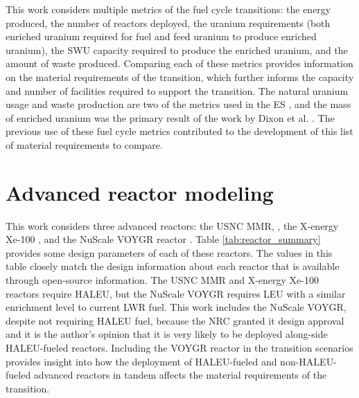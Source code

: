 This work considers multiple metrics of the fuel cycle transitions: 
the energy produced, the number of reactors deployed, the 
uranium requirements (both enriched uranium required for fuel and feed uranium 
to produce enriched uranium), 
the \gls{SWU} capacity required to produce the enriched uranium, and the 
amount of waste produced. Comparing each of these metrics provides 
information on the material requirements of the transition, which further 
informs the capacity and number of facilities required to support 
the transition. The natural 
uranium usage and waste production are two of the metrics used in the 
\acrfull{ES} 
\cite{wigeland_nuclear_2014}, and the mass of enriched uranium was the 
primary result of the work by Dixon et al. \cite{dixon_estimated_2022}. 
The previous use of these fuel cycle metrics contributed to the development 
of this list of material requirements to compare.

\section{Advanced reactor modeling} \label{sec:reactor_methods}
This work considers three advanced reactors: the \gls{USNC} \gls{MMR}, 
\cite{mitchell_usnc_2020,noauthor_usnc_2021}, the X-energy Xe-100 
\cite{mulder_overview_2021}, and the NuScale VOYGR reactor
\cite{nuscale_chapter_2020-1,reyes_nuscale_2021,reyes_correction_2022}. 
Table \ref{tab:reactor_summary} provides some design parameters 
of each of these reactors. The values in this table closely match the 
design information about each reactor that is available through open-source 
information. The 
\gls{USNC} \gls{MMR} and X-energy Xe-100 reactors require \gls{HALEU}, 
but the NuScale VOYGR requires \gls{LEU} with a similar enrichment level 
to current \gls{LWR} fuel. This work 
includes the NuScale VOYGR, despite not requiring \gls{HALEU} fuel, 
because the \gls{NRC} granted it design approval \cite{world_nuclear_news_nuscale_2021} 
and it is the author's opinion that it is very likely to be deployed 
along-side \gls{HALEU}-fueled 
reactors. Including the VOYGR reactor in the transition scenarios provides 
insight into how the deployment of \gls{HALEU}-fueled and non-\gls{HALEU}-fueled 
advanced reactors in tandem affects the material requirements of the transition. 

